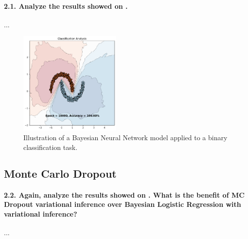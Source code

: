 \paragraph{2.1. Analyze the results showed on .}

...

\begin{figure}[H]
    \centering
    \includegraphics[width=0.45\textwidth]{mlp_variational.pdf}
    \caption{Illustration of a Bayesian Neural Network model applied to a binary classification task.}
    \label{fig:mlp_variational}
\end{figure}


\subsection{Monte Carlo Dropout}
\paragraph{2.2. Again, analyze the results showed on . What is the benefit of MC Dropout variational inference over Bayesian Logistic Regression with variational inference?}

...

